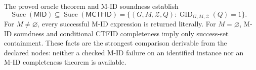 The proved oracle theorem and M-ID soundness establish
\[
 \operatorname{Succ}(\mathsf{MID})
 \subseteq
 \operatorname{Succ}(\mathsf{MCTFID})
 =\{(G,M,\mathcal Z,Q):
 \operatorname{GID}_{G,M,\mathcal Z}(Q)=1\}.
\]
For \(M\ne\varnothing\), every successful M-ID expression is returned literally.  For \(M=\varnothing\), M-ID soundness and conditional CTFID completeness imply only success-set containment.  These facts are the strongest comparison derivable from the declared nodes: neither a checked M-ID failure on an identified instance nor an M-ID completeness theorem is available.